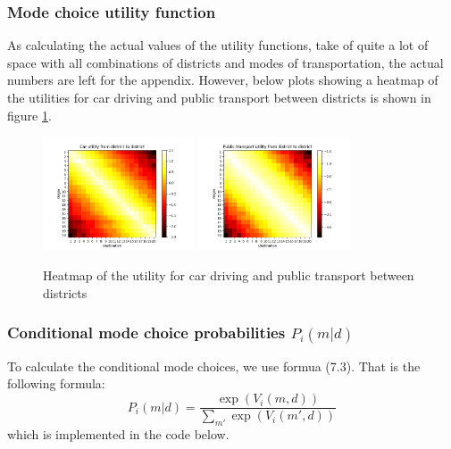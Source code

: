 \documentclass[a4paper,12pt]{article}
\begin{document}
\subsubsection{Mode choice utility function}
As calculating the actual values of the utility functions, take of quite a lot of space with all combinations of districts and modes of transportation, the actual numbers are left for the appendix.
However, below plots showing a heatmap of the utilities for car driving and public transport between districts is shown in figure \ref{fig:car_public_utility}.
\begin{figure}
    \centering
    \includegraphics[width=0.4\textwidth]{car_utility.png}
    \includegraphics[width=0.4\textwidth]{public_utility.png}
    \caption{Heatmap of the utility for car driving and public transport between districts}
    \label{fig:car_public_utility}
\end{figure}

\subsubsection{Conditional mode choice probabilities $P_i(m|d)$}
To calculate the conditional mode choices, we use formua (7.3).
That is the following formula:
$$
P_i(m|d) = \dfrac{\exp(V_i(m,d))}{\sum_{m'} \exp(V_i(m',d))}
$$
which is implemented in the code below.
\end{document}
